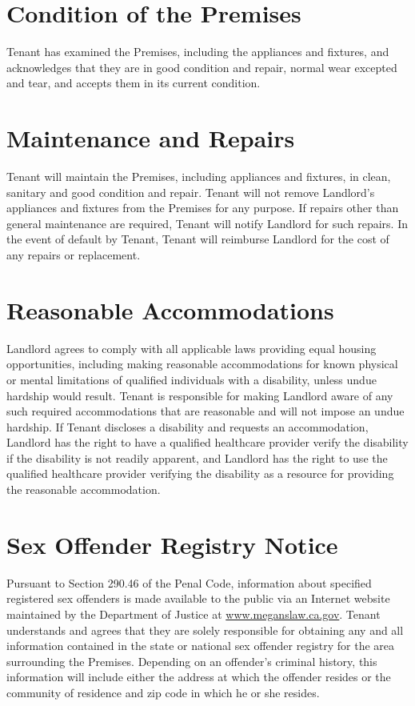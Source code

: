 \documentclass[12pt]{article}
\begin{document}
{\section{Condition of the Premises}
Tenant has examined the Premises, including the appliances and fixtures, and acknowledges that
they are in good condition and repair, normal wear excepted and tear, and accepts them in its
current condition.

\section{Maintenance and Repairs}
Tenant will maintain the Premises, including appliances and fixtures, in clean, sanitary and
good condition and repair. Tenant will not remove Landlord's appliances and fixtures from the
Premises for any purpose. If repairs other than general maintenance are required, Tenant will
notify Landlord for such repairs. In the event of default by Tenant, Tenant will reimburse
Landlord for the cost of any repairs or replacement.

\section{Reasonable Accommodations}
Landlord agrees to comply with all applicable laws providing equal housing opportunities,
including making reasonable accommodations for known physical or mental limitations of
qualified individuals with a disability, unless undue hardship would result. Tenant is
responsible for making Landlord aware of any such required accommodations that are reasonable
and will not impose an undue hardship. If Tenant discloses a disability and requests an
accommodation, Landlord has the right to have a qualified healthcare provider verify the
disability if the disability is not readily apparent, and Landlord has the right to use the
qualified healthcare provider verifying the disability as a resource for providing the
reasonable accommodation.

\section{Sex Offender Registry Notice}
Pursuant to Section 290.46 of the Penal Code, information about specified registered sex
offenders is made available to the public via an Internet website maintained by the Department
of Justice at \url{www.meganslaw.ca.gov}. Tenant understands and agrees that they are solely
responsible for obtaining any and all information contained in the state or national sex
offender registry for the area surrounding the Premises. Depending on an offender's criminal
history, this information will include either the address at which the offender resides or the
community of residence and zip code in which he or she resides.

}
\end{document}
